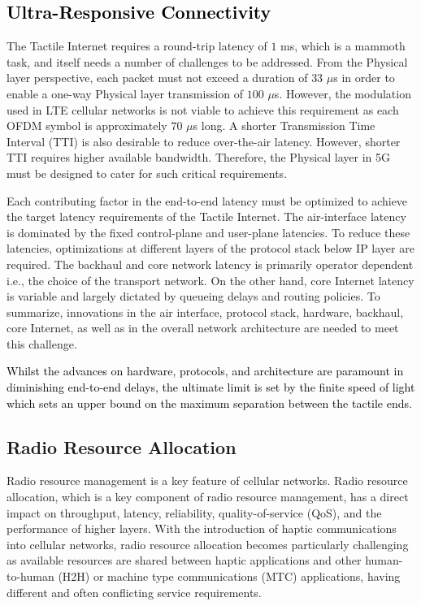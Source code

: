 \documentclass[journal]{IEEEtran}
\begin{document}
\subsection{\textcolor{black}{Ultra-Responsive Connectivity}}
The Tactile Internet requires a round-trip latency of $1$ ms, which is a mammoth task, and itself needs a number of challenges to be addressed. From the Physical layer perspective, each packet must not exceed a duration of $33$ $\mu$s \cite{5G-GF} in order to enable a one-way Physical layer transmission of $100$ $\mu$s. However, the modulation used in LTE cellular networks is not viable to achieve this requirement as each OFDM symbol is approximately $70$ $\mu$s long. A shorter Transmission Time Interval (TTI) is also desirable to reduce over-the-air latency. However, shorter TTI requires higher available bandwidth. Therefore, the Physical layer in 5G must be designed to cater for such critical requirements.


Each contributing factor in the end-to-end latency must be optimized to achieve the target latency requirements of the Tactile Internet. The air-interface latency is dominated by the fixed control-plane and user-plane latencies. To reduce these latencies, optimizations at different layers of the protocol stack below IP layer are required. The backhaul and core network latency is primarily operator dependent i.e., the choice of the transport network. On the other hand, core Internet latency is variable and largely dictated by queueing delays and routing policies. To summarize, innovations in the air interface, protocol stack, hardware, backhaul, core Internet, as well as in the overall network architecture are needed to meet this challenge.

\textcolor{black}{Whilst the advances on hardware, protocols, and architecture are paramount in diminishing end-to-end delays, the ultimate limit is set by the finite speed of light which sets an upper bound on the maximum separation between the tactile ends.
}






\subsection{Radio Resource Allocation}

Radio resource management is a key feature of cellular networks. Radio resource allocation, which is a key component of radio resource management, has a direct impact on throughput, latency, reliability, quality-of-service (QoS), and the performance of higher layers.  With the introduction of haptic communications into cellular networks, radio resource allocation becomes particularly challenging as available resources are shared between haptic applications and other human-to-human (H2H) or machine type communications (MTC) applications, having different and often conflicting service requirements.
\end{document}
